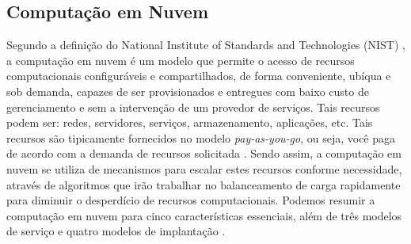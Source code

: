 \documentclass[twoside,english,brazilian]{UNISINOSartigo}
\begin{document}
\subsection{Computação em Nuvem}
\label{cloud}
Segundo a definição do National Institute of Standards and Technologies (NIST) \cite{Mell2012}, a computação em nuvem é um modelo que permite o acesso de recursos computacionais configuráveis e compartilhados, de forma conveniente, ubíqua e sob demanda, capazes de ser provisionados e entregues com baixo custo de gerenciamento e sem a intervenção de um provedor de serviços. Tais recursos podem ser: redes, servidores, serviços, armazenamento, aplicações, etc. Tais recursos são tipicamente fornecidos no modelo \textit{pay-as-you-go}, ou seja, você paga de acordo com a demanda de recursos solicitada \cite{Suleiman2012}. Sendo assim, a computação em nuvem se utiliza de mecanismos para escalar estes recursos conforme necessidade, através de algoritmos que irão trabalhar no balanceamento de carga rapidamente para diminuir o desperdício de recursos computacionais. Podemos resumir a computação em nuvem para cinco características essenciais, além de três modelos de serviço e quatro modelos de implantação \cite{Verdi2010}.
\end{document}
